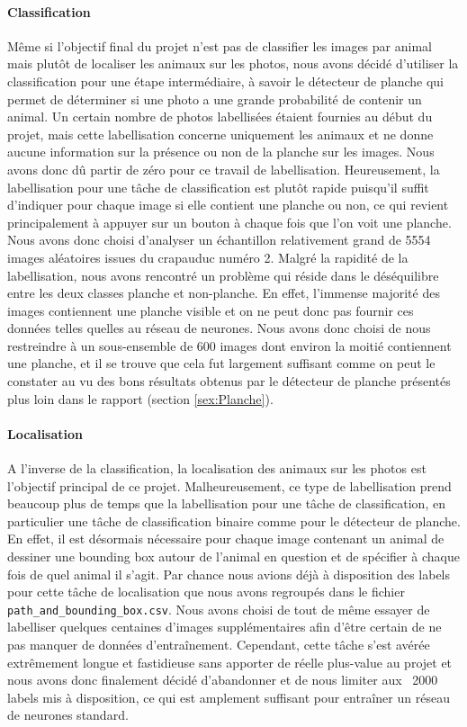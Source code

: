 \paragraph{Classification}

Même si l'objectif final du projet n'est pas de classifier les images par animal mais plutôt de localiser les animaux sur les photos, nous avons décidé d'utiliser la classification pour une étape intermédiaire, à savoir le détecteur de planche qui permet de déterminer si une photo a une grande probabilité de contenir un animal. Un certain nombre de photos labellisées étaient fournies au début du projet, mais cette labellisation concerne uniquement les animaux et ne donne aucune information sur la présence ou non de la planche sur les images. Nous avons donc dû partir de zéro pour ce travail de labellisation. Heureusement, la labellisation pour une tâche de classification est plutôt rapide puisqu'il suffit d'indiquer pour chaque image si elle contient une planche ou non, ce qui revient principalement à appuyer sur un bouton à chaque fois que l'on voit une planche. Nous avons donc choisi d'analyser un échantillon relativement grand de 5554 images aléatoires issues du crapauduc numéro 2. Malgré la rapidité de la labellisation, nous avons rencontré un problème qui réside dans le déséquilibre entre les deux classes planche et non-planche. En effet, l'immense majorité des images contiennent une planche visible et on ne peut donc pas fournir ces données telles quelles au réseau de neurones. Nous avons donc choisi de nous restreindre à un sous-ensemble de 600 images dont environ la moitié contiennent une planche, et il se trouve que cela fut largement suffisant comme on peut le constater au vu des bons résultats obtenus par le détecteur de planche présentés plus loin dans le rapport (section \ref{sex:Planche}).

\paragraph{Localisation}

A l'inverse de la classification, la localisation des animaux sur les photos est l'objectif principal de ce projet. Malheureusement, ce type de labellisation prend beaucoup plus de temps que la labellisation pour une tâche de classification, en particulier une tâche de classification binaire comme pour le détecteur de planche. En effet, il est désormais nécessaire pour chaque image contenant un animal de dessiner une bounding box autour de l'animal en question et de spécifier à chaque fois de quel animal il s'agit. Par chance nous avions déjà à disposition des labels pour cette tâche de localisation que nous avons regroupés dans le fichier \verb|path_and_bounding_box.csv|. Nous avons choisi de tout de même essayer de labelliser quelques centaines d'images supplémentaires afin d'être certain de ne pas manquer de données d'entraînement. Cependant, cette tâche s'est avérée extrêmement longue et fastidieuse sans apporter de réelle plus-value au projet et nous avons donc finalement décidé d'abandonner et de nous limiter aux ~2000 labels mis à disposition, ce qui est amplement suffisant pour entraîner un réseau de neurones standard. 
